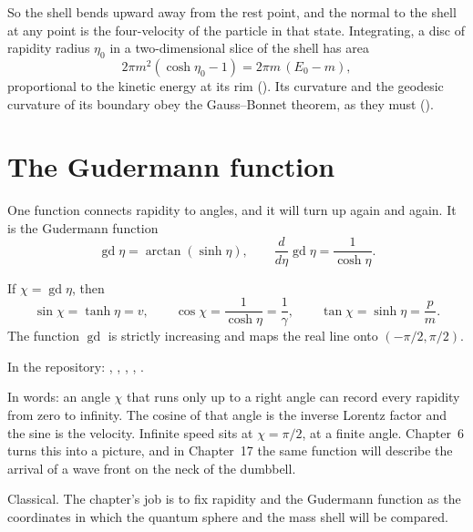 So the shell bends upward away from the rest point, and the normal to the shell at any point is the four-velocity of the particle in that state. Integrating, a disc of rapidity radius $\eta_0$ in a two-dimensional slice of the shell has area
\[
2\pi m^2(\cosh\eta_0-1)=2\pi m\,(E_0-m),
\]
proportional to the kinetic energy at its rim (). Its curvature and the geodesic curvature of its boundary obey the Gauss--Bonnet theorem, as they must ().

\section{The Gudermann function}

One function connects rapidity to angles, and it will turn up again and again. It is the Gudermann function
\[
\operatorname{gd}\eta=\arctan(\sinh\eta),\qquad \frac{d}{d\eta}\operatorname{gd}\eta=\frac{1}{\cosh\eta}.
\]

\begin{proposition}\proved\label{prop:gd}
If $\chi=\operatorname{gd}\eta$, then
\[
\sin\chi=\tanh\eta=v,\qquad \cos\chi=\frac1{\cosh\eta}=\frac1\gamma,\qquad \tan\chi=\sinh\eta=\frac pm .
\]
The function $\operatorname{gd}$ is strictly increasing and maps the real line onto $(-\pi/2,\pi/2)$.
\end{proposition}
\noindent In the repository: , , , , .

In words: an angle $\chi$ that runs only up to a right angle can record every rapidity from zero to infinity. The cosine of that angle is the inverse Lorentz factor and the sine is the velocity. Infinite speed sits at $\chi=\pi/2$, at a finite angle. Chapter~6 turns this into a picture, and in Chapter~17 the same function will describe the arrival of a wave front on the neck of the dumbbell.

\begin{standsbox}
Classical. The chapter's job is to fix rapidity and the Gudermann function as the coordinates in which the quantum sphere and the mass shell will be compared.
\end{standsbox}

